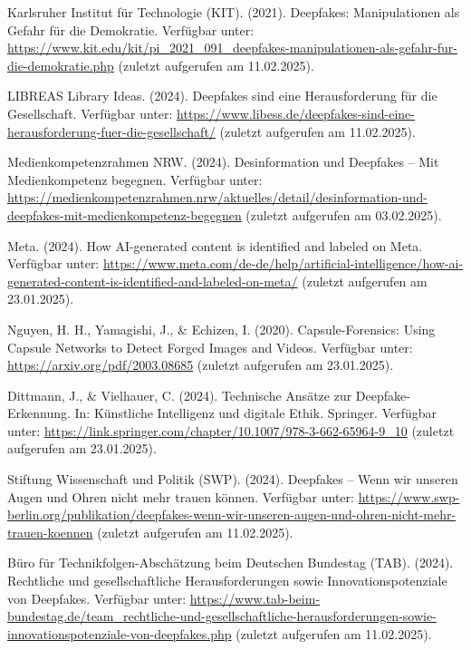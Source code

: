 \documentclass[a4paper,12pt]{article}
\begin{document}
\begin{thebibliography}{99}
 Karlsruher Institut für Technologie (KIT). (2021). Deepfakes: Manipulationen als Gefahr für die Demokratie.
Verfügbar unter: \url{https://www.kit.edu/kit/pi_2021_091_deepfakes-manipulationen-als-gefahr-fur-die-demokratie.php} (zuletzt aufgerufen am 11.02.2025).

 LIBREAS Library Ideas. (2024). Deepfakes sind eine Herausforderung für die Gesellschaft.
Verfügbar unter: \url{https://www.libess.de/deepfakes-sind-eine-herausforderung-fuer-die-gesellschaft/} (zuletzt aufgerufen am 11.02.2025).

 Medienkompetenzrahmen NRW. (2024). Desinformation und Deepfakes – Mit Medienkompetenz begegnen. 
Verfügbar unter: \url{https://medienkompetenzrahmen.nrw/aktuelles/detail/desinformation-und-deepfakes-mit-medienkompetenz-begegnen} (zuletzt aufgerufen am 03.02.2025).

 Meta. (2024). How AI-generated content is identified and labeled on Meta. 
Verfügbar unter: \url{https://www.meta.com/de-de/help/artificial-intelligence/how-ai-generated-content-is-identified-and-labeled-on-meta/} (zuletzt aufgerufen am 23.01.2025).

 Nguyen, H. H., Yamagishi, J., \& Echizen, I. (2020). Capsule-Forensics: Using Capsule Networks to Detect Forged Images and Videos.
Verfügbar unter: \url{https://arxiv.org/pdf/2003.08685} (zuletzt aufgerufen am 23.01.2025).

 Dittmann, J., \& Vielhauer, C. (2024). Technische Ansätze zur Deepfake-Erkennung. In: Künstliche Intelligenz und digitale Ethik. Springer. 
Verfügbar unter: \url{https://link.springer.com/chapter/10.1007/978-3-662-65964-9_10} (zuletzt aufgerufen am 23.01.2025).

 Stiftung Wissenschaft und Politik (SWP). (2024). Deepfakes – Wenn wir unseren Augen und Ohren nicht mehr trauen können.  
Verfügbar unter: \url{https://www.swp-berlin.org/publikation/deepfakes-wenn-wir-unseren-augen-und-ohren-nicht-mehr-trauen-koennen} (zuletzt aufgerufen am 11.02.2025).

 Büro für Technikfolgen-Abschätzung beim Deutschen Bundestag (TAB). (2024). Rechtliche und gesellschaftliche Herausforderungen sowie Innovationspotenziale von Deepfakes.
Verfügbar unter: \url{https://www.tab-beim-bundestag.de/team_rechtliche-und-gesellschaftliche-herausforderungen-sowie-innovationspotenziale-von-deepfakes.php} (zuletzt aufgerufen am 11.02.2025).


\end{thebibliography}
\end{document}
